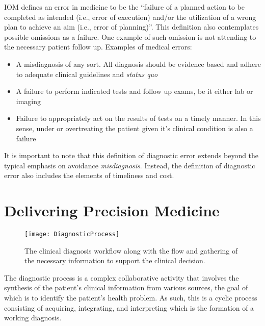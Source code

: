 IOM defines an error in medicine to be the “failure of a planned action to be completed as intended (i.e., error of execution) and/or the utilization of a wrong plan to achieve an aim (i.e., error of planning)”\cite{iom2004}. This definition also contemplates possible omissions as a failure. One example of such omission is not attending to the necessary patient follow up. Examples of medical errors:

\begin{itemize}
\item A misdiagnosis of any sort. All diagnosis should be evidence based and adhere to adequate clinical guidelines and \emph{status quo}
\item A failure to perform indicated tests and follow up exams, be it either lab or imaging
\item Failure to appropriately act on the results of tests on a timely manner. In this sense, under or overtreating the patient given it's clinical condition is also a failure
\end{itemize}

It is important to note that this definition of diagnostic error extends beyond the typical emphasis on avoidance \emph{misdiagnosis}. Instead, the definition of diagnostic error also includes the elements of timeliness and cost.

\section{Delivering Precision Medicine}

\begin{figure}
\begin{centering}
\texttt{[image: DiagnosticProcess]}
\par\end{centering}
\caption{\label{fig:DiagnosticProcess}The clinical diagnosis workflow along with the flow and gathering of the necessary information to support the clinical decision\cite{parasuraman2000}.}
\end{figure}

The diagnostic process is a complex collaborative activity that involves the synthesis of the patient’s clinical information from various sources, the goal of which is to identify the patient’s health problem. As such, this is a cyclic process consisting of acquiring, integrating, and interpreting which is the formation of a working diagnosis. 

